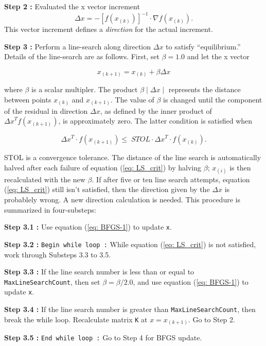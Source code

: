 \vspace{0.15 in}\noindent
{\bf Step 2 :}
Evaluated the x vector increment 
\begin{equation}
\Delta x = - {\left[ f(x_{(k)}) \right]}^{-1} \cdot {\nabla f(x_{(k)})}.
\label{eq: BFGS-1}
\end{equation}
This vector increment defines a {\it direction} for the actual increment.
 
\vspace{0.15 in}\noindent
{\bf Step 3 :}
Perform a line-search along direction $\Delta x$ to satisfy ``equilibrium.''
Details of the line-search are as follows. First,
set $\beta = 1.0$ and let the x vector 

\begin{equation}
x_{(k+1)}  = x_{(k)} + \beta \Delta x
\label{eq: BFGS-2}
\end{equation}

\noindent
where $\beta$ is a scalar multipler.
The product $\beta \mid \Delta x \mid$ represents
the distance between points $x_{(k)}$ and $x_{(k+1)}$.
The value of $\beta$ is changed until the component of the
residual in direction $\Delta x$, as defined by the inner
product of ${\Delta x}^T f(x_{(k+1)})$, is approximately zero.
The latter condition is satisfied when

\begin{equation}
{\Delta x}^T \cdot f(x_{(k+1)}) \leq \; STOL \cdot {\Delta x}^T \cdot f(x_{(k)}).
\label{eq: LS_crit}
\end{equation}

\vspace{0.15 in}\noindent
STOL is a convergence tolerance. 
The distance of the line search is automatically halved
after each failure of equation (\ref{eq: LS_crit}) by halving $\beta$;
$x_{(i)}$ is then recalculated with the new $\beta$.
If after five or ten line search attempts,
equation (\ref{eq: LS_crit}) still isn't satisfied,
then the direction given by the $\Delta x$ is probablely wrong.
A new direction calculation is needed.
This procedure is summarized in four-substeps:

\begin{description}
\item{\bf Step 3.1 :}
Use equation (\ref{eq: BFGS-1}) to update {\tt x}.

\item{\bf Step 3.2 :}
{\tt Begin while loop :} While equation (\ref{eq: LS_crit}) is not satisfied,
work through Substeps 3.3 to 3.5.

\item{\bf Step 3.3 :}
If the line search number is less than or
equal to {\tt MaxLineSearchCount}, then set $\beta = \beta/2.0$,
and use equation (\ref{eq: BFGS-1}) to update {\tt x}.

\item{\bf Step 3.4 :}
If the line search number is greater than {\tt MaxLineSearchCount},
then break the while loop. Recalculate matrix {\tt K} at $x =  x_{(k+1)}$.
Go to Step 2. 

\item{\bf Step 3.5 :}
{\tt End while loop :} Go to Step 4 for BFGS update.
\end{description}

